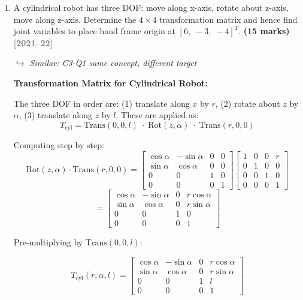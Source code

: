 \documentclass[12pt,a3paper]{article}
\newcommand{\yr}[1]{\hfill\textcolor{gray}{\small\textbf{[#1]}}}
\newcommand{\mk}[1]{\textcolor{orange!70!black}{\small\textbf{(#1 marks)}}}
\newcommand{\variant}[1]{\par\vspace{1pt}\textcolor{blue!50!black}%
  {\footnotesize\textit{$\hookrightarrow$ Similar: #1}}}
\begin{document}
\begin{enumerate}
\begin{tcolorbox}[enhanced,breakable,ansbox,colback=cC!4,colframe=cC,
  boxrule=0.8pt,arc=5pt,
  title={\textbf{Answer}},fonttitle=\bfseries\color{white},colbacktitle=cC]
\end{tcolorbox}


\item \label{qlabel:C3-Q2}
A cylindrical robot has three DOF: move along x-axis, rotate about z-axis, move along z-axis. Determine the $4\times4$ transformation matrix and hence find joint variables to place hand frame origin at $[6,\;-3,\;-4]^T$. \mk{15}
\yr{2021--22} \variant{C3-Q1 same concept, different target}


\begin{tcolorbox}[enhanced,breakable,ansbox,colback=cC!4,colframe=cC,
  boxrule=0.8pt,arc=5pt,
  title={\textbf{Answer}},fonttitle=\bfseries\color{white},colbacktitle=cC]

\textbf{Transformation Matrix for Cylindrical Robot:}

The three DOF in order are: (1) translate along $x$ by $r$,
(2) rotate about $z$ by $\alpha$, (3) translate along $z$ by $l$.
These are applied as:
\[
  T_{\mathrm{cyl}} = \mathrm{Trans}(0,0,l)\;\cdot\;\mathrm{Rot}(z,\alpha)\;\cdot\;\mathrm{Trans}(r,0,0)
\]

Computing step by step:
\[
  \mathrm{Rot}(z,\alpha)\cdot\mathrm{Trans}(r,0,0)
  = \begin{bmatrix}
      \cos\alpha & -\sin\alpha & 0 & 0 \\
      \sin\alpha &  \cos\alpha & 0 & 0 \\
      0 & 0 & 1 & 0 \\
      0 & 0 & 0 & 1
    \end{bmatrix}
    \begin{bmatrix}1&0&0&r\\0&1&0&0\\0&0&1&0\\0&0&0&1\end{bmatrix}
\]
\[
= \begin{bmatrix}
      \cos\alpha & -\sin\alpha & 0 & r\cos\alpha \\
      \sin\alpha &  \cos\alpha & 0 & r\sin\alpha \\
      0 & 0 & 1 & 0 \\
      0 & 0 & 0 & 1
    \end{bmatrix}
\]

Pre-multiplying by $\mathrm{Trans}(0,0,l)$:

\[
  \boxed{T_{\mathrm{cyl}}(r,\alpha,l) =
  \begin{bmatrix}
    \cos\alpha & -\sin\alpha & 0 & r\cos\alpha \\
    \sin\alpha &  \cos\alpha & 0 & r\sin\alpha \\
    0          &  0          & 1 & l           \\
    0          &  0          & 0 & 1
  \end{bmatrix}}
\]


\end{tcolorbox}
\end{enumerate}
\end{document}
